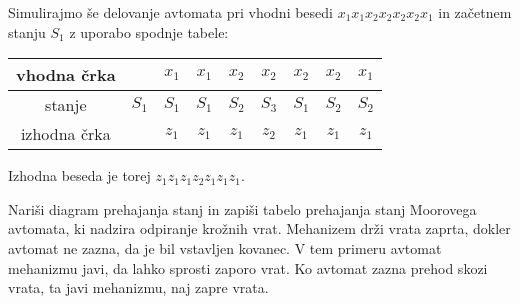 \begin{resitev}


\bigskip

Simulirajmo še delovanje avtomata pri vhodni besedi $x_1 x_1 x_2 x_2 x_2 x_2 x_1$ in začetnem stanju $S_1$ z uporabo spodnje tabele:

\bigskip

\begin{center}
\begin{tabular}{c|cccccccc}
vhodna črka 	&				& $x_1$ & $x_1$ & $x_2$ & $x_2$ & $x_2$ & $x_2$ & $x_1$ \\
\hline
stanje 				& $S_1$ & $S_1$ & $S_1$ & $S_2$ & $S_3$ & $S_1$ & $S_2$ & $S_2$ \\
\hline
izhodna črka	&				& $z_1$ & $z_1$ & $z_1$ & $z_2$ & $z_1$ & $z_1$ & $z_1$ 
\end{tabular}
\end{center}
\end{resitev}

\bigskip

Izhodna beseda je torej $z_1z_1z_1z_2z_1z_1z_1$.

\begin{zgled}
\label{Moore_door}
Nariši diagram prehajanja stanj in zapiši tabelo prehajanja stanj Moorovega avtomata, ki nadzira odpiranje krožnih vrat. Mehanizem drži vrata zaprta, dokler avtomat ne zazna, da je bil vstavljen kovanec. V tem primeru avtomat mehanizmu javi, da lahko sprosti zaporo vrat. Ko avtomat zazna prehod skozi vrata, ta javi mehanizmu, naj zapre vrata.
\end{zgled}

